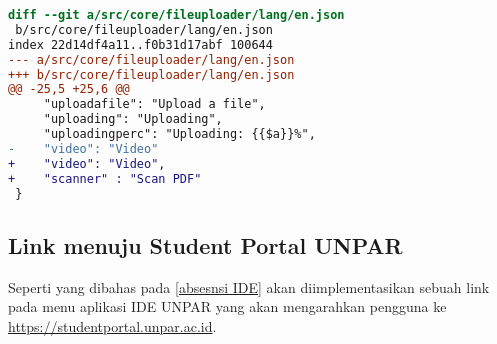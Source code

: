 \begin{lstlisting}[language=diff, frame=single, label ={fileuploader-lang-eng}, caption = Perubahan pada file \texttt{src/core/fileuploader/lang/en.json} ]
diff --git a/src/core/fileuploader/lang/en.json
 b/src/core/fileuploader/lang/en.json
index 22d14df4a11..f0b31d17abf 100644
--- a/src/core/fileuploader/lang/en.json
+++ b/src/core/fileuploader/lang/en.json
@@ -25,5 +25,6 @@
     "uploadafile": "Upload a file",
     "uploading": "Uploading",
     "uploadingperc": "Uploading: {{$a}}%",
-    "video": "Video"
+    "video": "Video",
+    "scanner" : "Scan PDF"
 }
\end{lstlisting} 

\subsection{Link menuju Student Portal UNPAR}
Seperti yang dibahas pada \ref{absesnsi IDE} akan diimplementasikan sebuah link pada menu aplikasi IDE UNPAR yang akan mengarahkan pengguna ke \url{https://studentportal.unpar.ac.id}.


